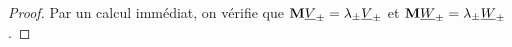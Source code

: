 \begin{proof}
        Par un calcul immédiat, on vérifie que $\mathbf{M}\underline{V}_\pm = \lambda_\pm\underline{V}_\pm$ et $\mathbf{M}\underline{W}_\pm = \lambda_\pm\underline{W}_\pm$.

    \end{proof}

